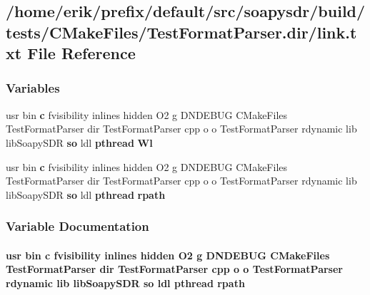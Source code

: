 \subsection{/home/erik/prefix/default/src/soapysdr/build/tests/\+C\+Make\+Files/\+Test\+Format\+Parser.dir/link.txt File Reference}
\label{soapysdr_2build_2tests_2CMakeFiles_2TestFormatParser_8dir_2link_8txt}
\subsubsection*{Variables}
\begin{DoxyCompactItemize}
\item 
usr bin {\bf c} fvisibility inlines hidden O2 g D\+N\+D\+E\+B\+UG C\+Make\+Files Test\+Format\+Parser dir Test\+Format\+Parser cpp o o Test\+Format\+Parser rdynamic lib lib\+Soapy\+S\+DR {\bf so} ldl {\bf pthread} {\bf Wl}
\item 
usr bin {\bf c} fvisibility inlines hidden O2 g D\+N\+D\+E\+B\+UG C\+Make\+Files Test\+Format\+Parser dir Test\+Format\+Parser cpp o o Test\+Format\+Parser rdynamic lib lib\+Soapy\+S\+DR {\bf so} ldl {\bf pthread} {\bf rpath}
\end{DoxyCompactItemize}


\subsubsection{Variable Documentation}
\paragraph[{rpath}]{\setlength{\rightskip}{0pt plus 5cm}usr bin {\bf c} fvisibility inlines hidden O2 g D\+N\+D\+E\+B\+UG C\+Make\+Files Test\+Format\+Parser dir Test\+Format\+Parser cpp o o Test\+Format\+Parser rdynamic lib lib\+Soapy\+S\+DR {\bf so} ldl {\bf pthread} rpath}\label{soapysdr_2build_2tests_2CMakeFiles_2TestFormatParser_8dir_2link_8txt_a65a60a517474929e1b49a53763ba495d}


